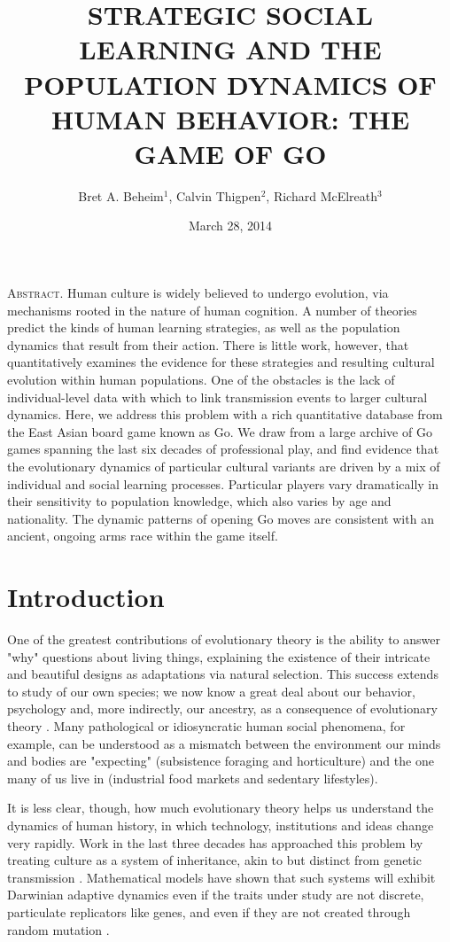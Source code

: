 \documentclass[reqno,12pt]{amsart}
\title[STRATEGIC SOCIAL LEARNING]
{\large STRATEGIC SOCIAL LEARNING AND THE POPULATION DYNAMICS OF HUMAN BEHAVIOR:
THE GAME OF GO}
\author{Bret A. Beheim\(^1\), Calvin Thigpen\(^2\), Richard McElreath\(^3\)}
\date{March 28, 2014}
\begin{document}
\maketitle

\noindent\textsc{Abstract.}
Human culture is widely believed to undergo evolution, via mechanisms rooted in the nature of human cognition. A number of theories predict the kinds of human learning strategies, as well as the population dynamics that result from their action. There is little work, however, that quantitatively examines the evidence for these strategies and resulting cultural evolution within human populations. One of the obstacles is the lack of individual-level data with which to link transmission events to larger cultural dynamics. Here, we address this problem with a rich quantitative database from the East Asian board game known as Go. We draw from a large archive of Go games spanning the last six decades of professional play, and find evidence that the evolutionary dynamics of particular cultural variants are driven by a mix of individual and social learning processes. Particular players vary dramatically in their sensitivity to population knowledge, which also varies by age and nationality. The dynamic patterns of opening Go moves are consistent with an ancient, ongoing arms race within the game itself.

\vspace{12pt}

\vspace{24pt}


\section{Introduction}

One of the greatest contributions of evolutionary theory is the ability to answer "why" questions about living things, explaining the existence of their intricate and beautiful designs as adaptations via natural selection. This success extends to study of our own species; we now know a great deal about our behavior, psychology and, more indirectly, our ancestry, as a consequence of evolutionary theory \citep{barkow1992adaptedmind, laland2002sense}. Many pathological or idiosyncratic human social phenomena, for example, can be understood as a mismatch between the environment our minds and bodies are "expecting" (subsistence foraging and horticulture) and the one many of us live in (industrial food markets and sedentary lifestyles).

It is less clear, though, how much evolutionary theory helps us understand the dynamics of human history, in which technology, institutions and ideas change very rapidly. Work in the last three decades has approached this problem by treating culture as a system of inheritance, akin to but distinct from genetic transmission \citep{durham1992coevolution, richerson2005genesalone}. Mathematical models have shown that such systems will exhibit Darwinian adaptive dynamics even if the traits under study are not discrete, particulate replicators like genes, and even if they are not created through random mutation \citep{boyd1985culture, henrich2002replicators}.
\end{document}

